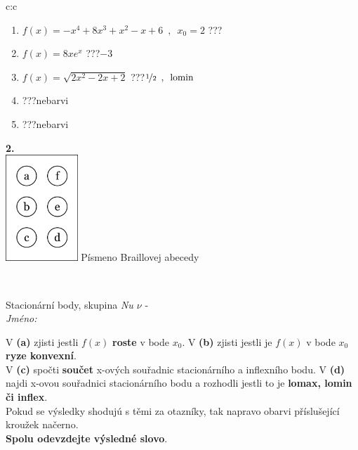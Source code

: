 \documentclass[10pt]{report}
\begin{document}
\begin{tabular}{c:c}
\begin{minipage}[c][104.5mm][t]{0.5\linewidth}
\begin{center}
\begin{minipage}{0.79\linewidth}
\begin{center}
\begin{varwidth}{\linewidth}
\begin{enumerate}
\item $f(x)=-x^4+8x^3+x^2-x+6\enspace , \enspace x_0=2$\quad \dotfill\; ???\;\dotfill \quad {}
\item $f(x)=8xe^{x}$\quad \dotfill\; ???\;\dotfill \quad $-3$
\item $f(x)=\sqrt{2x^2-2x+2}$\quad \dotfill\; ???\;\dotfill \quad $\nicefrac{1}{2}\enspace , \enspace \mathrm{lomin}$
\item \quad \dotfill\; ???\;\dotfill \quad nebarvi
\item \quad \dotfill\; ???\;\dotfill \quad nebarvi
\end{enumerate}
\end{varwidth}
\end{center}
\end{minipage}
\begin{minipage}{0.20\linewidth}
\begin{center}
{\Huge\bfseries 2.} \\[2mm]
\includegraphics[height=40mm]{../images/braille.png}
{\small Písmeno Braillovej abecedy}
\end{center}
\end{minipage}
\end{center}
\end{minipage}
\\ \hdashline
\begin{minipage}[c][104.5mm][t]{0.5\linewidth}
\begin{center}
\vspace{7mm}
{\huge Stacionární body, skupina \textit{Nu $\nu$} -}\\[5mm]
\textit{Jméno:}\phantom{xxxxxxxxxxxxxxxxxxxxxxxxxxxxxxxxxxxxxxxxxxxxxxxxxxxxxxxxxxxxxxxxx}\\[5mm]
\begin{minipage}{0.95\linewidth}
\begin{center}
{\small V \textbf{(a)} zjisti jestli $f(x)$ \textbf{roste} v bode $x_0$. V \textbf{(b)} zjisti jestli je $f(x)$ v bode $x_0$ \textbf{ryze konvexní}.\\V \textbf{(c)} spočti \textbf{součet} x-ových souřadnic stacionárního a inflexního bodu. V \textbf{(d)} najdi x-ovou souřadnici stacionárního bodu a rozhodli jestli to je \textbf{lomax, lomin či inflex}.\\Pokud se výsledky shodujú s těmi za otazníky, tak napravo obarvi příslušející kroužek načerno.\\\textbf{Spolu odevzdejte výsledné slovo}}.

\end{center}
\end{minipage}
\end{center}
\end{minipage}
\end{tabular}
\end{document}
